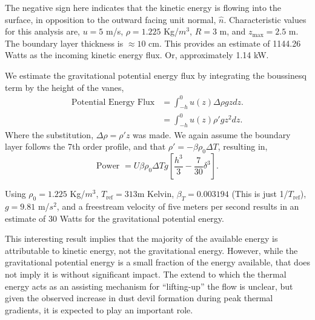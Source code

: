 
The negative sign here indicates that the kinetic energy is flowing into
the surface, in opposition to the outward facing unit normal, $\hat
n$. Characteristic values for this analysis are, $u = 5$ m/s, $\rho =
1.225$ Kg/$m^3$, $R = 3$ m, and $z_{\text{max}} = 2.5$ m. The boundary
layer thickness is $\approx 10$ cm. This provides
an estimate of 1144.26 Watts as the incoming kinetic energy flux. Or,
approximately 1.14 kW.  

We estimate the gravitational potential
energy flux by integrating the boussinesq term by the height of the vanes, 
\begin{align*}
  \text{Potential Energy Flux} & = \int_{-h}^0 u(z) \Delta \rho g z dz. \\
  & = \int_{-h}^0 u(z) \rho' g z^2 dz. 
\end{align*}
Where the substitution, $\Delta \rho = \rho' z$ was made. We again
assume the boundary layer follows the 7th order profile, and 
%
that $\rho' = -\beta \rho_0 \Delta T$, resulting in, 
%
%
\begin{equation}
 \text{Power } = U \beta \rho_0 \Delta T g \left[ \frac{h^3}{3} -
					    \frac{7}{30} \delta^3
					   \right]. 
\end{equation}

Using $\rho_0 = 1.225$ Kg/$m^3$, $T_{\text{ref}}=313$m Kelvin, $\beta_T
= 0.003194$ (This is just 1/$T_{\text{ref}}$), $g=9.81$ m/$s^2$, and a
freestream velocity of five meters per second results in an
estimate of 30 Watts for the gravitational potential energy. 

This interesting result implies that the majority of the available
energy is attributable to kinetic energy, not the gravitational
energy. 
However, while the
gravitational potential energy is a small fraction of the energy
available, that does not imply it is without significant impact. The
extend to which the thermal energy acts as an assisting mechanism for 
``lifting-up'' the flow is unclear, but given the observed increase in dust
devil formation during peak thermal gradients, it is expected
to play an important role. 

